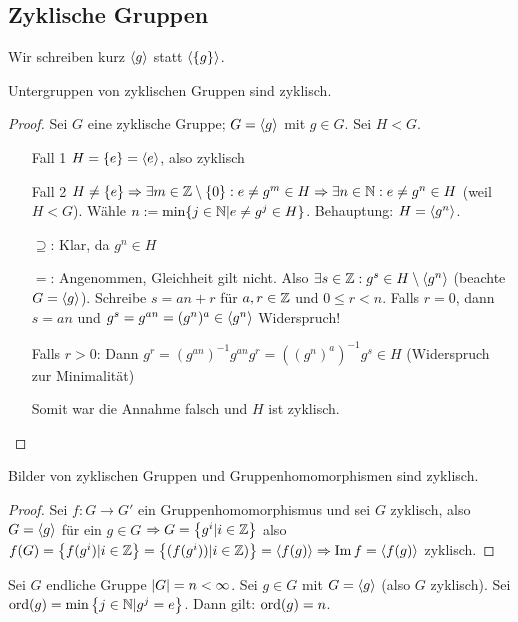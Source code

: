 \documentclass[12pt,a4paper]{scrartcl}
\begin{document}
\subsection{Zyklische Gruppen}
Wir schreiben kurz $\langle g\rangle$ statt $\langle\{g\}\rangle$.
\begin{satz}
	Untergruppen von zyklischen Gruppen sind zyklisch.
\end{satz}

\begin{proof}
	Sei $G$ eine zyklische Gruppe; $G = \langle g\rangle$ mit $g\in G$. Sei $H<G$.\begin{itemize}
		\item[Fall 1] $H = \{e\} = \langle e\rangle$, also zyklisch
		\item[Fall 2] $H\neq \{e\}\Rightarrow \exists m\in \mathbb Z\setminus\{0\}: e\neq g^m\in H\Rightarrow \exists n\in \mathbb N: e\neq g^n\in H$ (weil $H<G$). Wähle $n := \min\{j\in \mathbb N|e\neq g^j\in H\}$. Behauptung: $H = \langle g^n\rangle$.
		
		\glqq$\supseteq$\grqq: Klar, da $g^n\in H$
		
		\glqq$=$\grqq: Angenommen, Gleichheit gilt nicht. Also $\exists s\in \mathbb Z: g^s\in H\setminus\langle g^n\rangle$ (beachte $G = \langle g\rangle$). Schreibe $s = an+r$ für $a,r\in \mathbb Z$ und $0\leq r<n$. Falls $r = 0$, dann $s = an$ und $g^s = g^{an} = (g^n)^a\in \langle g^n\rangle$ Widerspruch!
		
		Falls $r>0$: Dann $g^r = (g^{an})^{-1}g^{an}g^r = ((g^n)^a)^{-1}g^s\in H$ (Widerspruch zur Minimalität)
		
		Somit war die Annahme falsch und $H$ ist zyklisch.
	\end{itemize}
\end{proof}


\begin{lem}
	Bilder von zyklischen Gruppen und Gruppenhomomorphismen sind zyklisch.
\end{lem}

\begin{proof}
	Sei $f: G \rightarrow G'$ ein Gruppenhomomorphismus und sei $G$ zyklisch, also $G = \langle g\rangle$ für ein $g \in G$ $\Rightarrow G = \left\lbrace g^i | i \in \mathbb Z \right\rbrace$ also $f(G) = \left\lbrace f(g^i) | i\in \mathbb Z \right\rbrace = \left\lbrace (f(g^i)) | i \in \mathbb Z)\right\rbrace = \langle f(g)\rangle \Rightarrow \operatorname{Im} f = \langle f(g)\rangle$ zyklisch.
\end{proof}

\begin{lem} \label{lem:ord}
	Sei $G$ endliche Gruppe $\lvert G\rvert = n < \infty$. Sei $g \in G$ mit $G=\langle g\rangle$ (also $G$ zyklisch).
	Sei $\operatorname{ord}(g) = \min \left\lbrace j \in \mathbb N | g^j = e\right\rbrace $.
	Dann gilt: $\operatorname{ord}(g) = n$. 
\end{lem}
\end{document}
